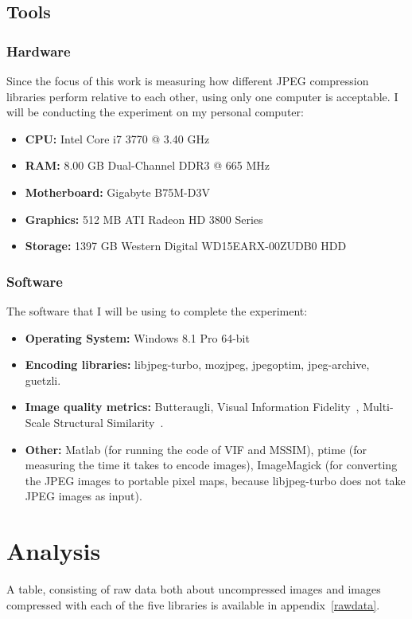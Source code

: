\documentclass[12pt]{article}
\begin{document}
\subsection{Tools}
\subsubsection{Hardware}
Since the focus of this work is measuring how different JPEG compression libraries perform relative to each other, using only one computer is acceptable. I will be conducting the experiment on my personal computer:
\begin{itemize}
	\item \textbf{CPU:} Intel Core i7 3770 @ 3.40 GHz
	\item \textbf{RAM:} 8.00 GB Dual-Channel DDR3 @ 665 MHz
	\item \textbf{Motherboard:} Gigabyte B75M-D3V
	\item \textbf{Graphics:} 512 MB ATI Radeon HD 3800 Series
	\item \textbf{Storage:} 1397 GB Western Digital WD15EARX-00ZUDB0 HDD
\end{itemize}
\clearpage
\subsubsection{Software}
The software that I will be using to complete the experiment:
\begin{itemize}
	\item \textbf{Operating System:} Windows 8.1 Pro 64-bit
	\item \textbf{Encoding libraries:} libjpeg-turbo, mozjpeg, jpegoptim, jpeg-archive, guetzli.
	\item \textbf{Image quality metrics:} Butteraugli, Visual Information Fidelity~\cite{VIFneed}, Multi-Scale Structural Similarity~\cite{MSSIMneed}.
	\item \textbf{Other:} Matlab (for running the code of VIF and MSSIM), ptime (for measuring the time it takes to encode images), ImageMagick (for converting the JPEG images to portable pixel maps, because libjpeg-turbo does not take JPEG images as input).
\end{itemize}
\clearpage
\section{Analysis}
A table, consisting of raw data both about uncompressed images and images compressed with each of the five libraries is available in appendix~\ref{rawdata}.
\end{document}
